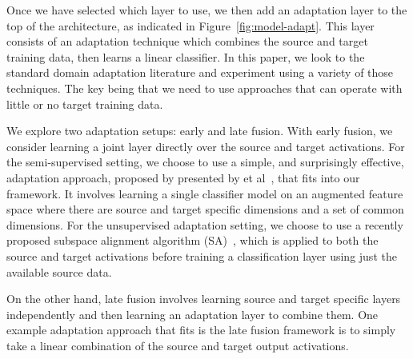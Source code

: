 Once we have selected which layer to use, we then add an adaptation layer to
the top of the architecture, as indicated in Figure~\ref{fig:model-adapt}. This layer
consists of an adaptation technique which combines the source and target
training data, then learns a linear classifier. In this paper, we look to the
standard domain adaptation literature and experiment using a variety of those
techniques. The key being that we need to use approaches that can operate with little or no
target training data.

We explore two adaptation setups: early and late fusion. 
With early fusion, we consider
 learning a joint layer directly over the source and target activations. For the semi-supervised setting,
 we choose to use a simple, and surprisingly effective, 
 adaptation approach, proposed by presented by \daume et al~\cite{daume}, that fits into our framework. It involves 
 learning a single classifier model on an augmented feature space where there are source and target specific 
 dimensions and a set of common dimensions. For the unsupervised adaptation setting, we choose to use a recently
 proposed subspace alignment algorithm (SA)~\cite{sa}, which is applied to both the source and target activations before 
 training a classification layer using just the available source data. 
 
 On the other hand, late fusion involves learning source and target
 specific layers independently and then learning an adaptation layer to combine them. One example adaptation 
 approach that fits is the late fusion framework is to simply take a linear combination of the source and target 
 output activations. 

